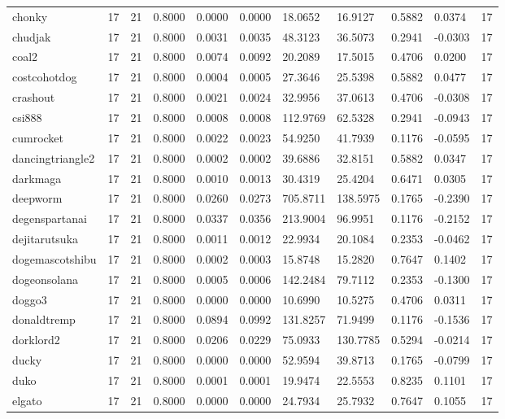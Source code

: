 \begin{table}[htbp]
\begin{tabular}{lllllllllll}
chonky & 17 & 21 & 0.8000 & 0.0000 & 0.0000 & 18.0652 & 16.9127 & 0.5882 & 0.0374 & 17 \\
chudjak & 17 & 21 & 0.8000 & 0.0031 & 0.0035 & 48.3123 & 36.5073 & 0.2941 & -0.0303 & 17 \\
coal2 & 17 & 21 & 0.8000 & 0.0074 & 0.0092 & 20.2089 & 17.5015 & 0.4706 & 0.0200 & 17 \\
costcohotdog & 17 & 21 & 0.8000 & 0.0004 & 0.0005 & 27.3646 & 25.5398 & 0.5882 & 0.0477 & 17 \\
crashout & 17 & 21 & 0.8000 & 0.0021 & 0.0024 & 32.9956 & 37.0613 & 0.4706 & -0.0308 & 17 \\
csi888 & 17 & 21 & 0.8000 & 0.0008 & 0.0008 & 112.9769 & 62.5328 & 0.2941 & -0.0943 & 17 \\
cumrocket & 17 & 21 & 0.8000 & 0.0022 & 0.0023 & 54.9250 & 41.7939 & 0.1176 & -0.0595 & 17 \\
dancingtriangle2 & 17 & 21 & 0.8000 & 0.0002 & 0.0002 & 39.6886 & 32.8151 & 0.5882 & 0.0347 & 17 \\
darkmaga & 17 & 21 & 0.8000 & 0.0010 & 0.0013 & 30.4319 & 25.4204 & 0.6471 & 0.0305 & 17 \\
deepworm & 17 & 21 & 0.8000 & 0.0260 & 0.0273 & 705.8711 & 138.5975 & 0.1765 & -0.2390 & 17 \\
degenspartanai & 17 & 21 & 0.8000 & 0.0337 & 0.0356 & 213.9004 & 96.9951 & 0.1176 & -0.2152 & 17 \\
dejitarutsuka & 17 & 21 & 0.8000 & 0.0011 & 0.0012 & 22.9934 & 20.1084 & 0.2353 & -0.0462 & 17 \\
dogemascotshibu & 17 & 21 & 0.8000 & 0.0002 & 0.0003 & 15.8748 & 15.2820 & 0.7647 & 0.1402 & 17 \\
dogeonsolana & 17 & 21 & 0.8000 & 0.0005 & 0.0006 & 142.2484 & 79.7112 & 0.2353 & -0.1300 & 17 \\
doggo3 & 17 & 21 & 0.8000 & 0.0000 & 0.0000 & 10.6990 & 10.5275 & 0.4706 & 0.0311 & 17 \\
donaldtremp & 17 & 21 & 0.8000 & 0.0894 & 0.0992 & 131.8257 & 71.9499 & 0.1176 & -0.1536 & 17 \\
dorklord2 & 17 & 21 & 0.8000 & 0.0206 & 0.0229 & 75.0933 & 130.7785 & 0.5294 & -0.0214 & 17 \\
ducky & 17 & 21 & 0.8000 & 0.0000 & 0.0000 & 52.9594 & 39.8713 & 0.1765 & -0.0799 & 17 \\
duko & 17 & 21 & 0.8000 & 0.0001 & 0.0001 & 19.9474 & 22.5553 & 0.8235 & 0.1101 & 17 \\
elgato & 17 & 21 & 0.8000 & 0.0000 & 0.0000 & 24.7934 & 25.7932 & 0.7647 & 0.1055 & 17 \\

\end{tabular}
\end{table}
